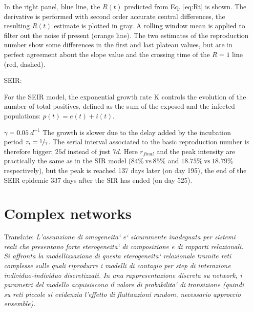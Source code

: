 \documentclass[DIV=12, BCOR=0pt]{scrartcl}  %
\begin{document}
	In the right panel, blue line, the $R(t)$ predicted from Eq. \ref{eq:Rt} is shown. 
	The derivative is performed with second order accurate central differences, the resulting $R(t)$ estimate is plotted in gray. A rolling window mean is applied to filter out the noise if present (orange line). The two estimates of the reproduction number show some differences in the first and last plateau values, but are in perfect agreement about the slope value and the crossing time of the $R = 1$ line (red, dashed).
	
	
	SEIR:	
	
	For the SEIR model, the exponential growth rate K controls the evolution of the number of total positives, defined as the sum of the exposed and the infected populations: $p(t) = e(t) + i(t)$. 
	
	
	$\gamma = 0.05 \ d^{-1}$ The growth is slower due to the delay added by the incubation period $\tau_{i}=\sfrac{1}{\gamma}$. The serial interval associated to the basic reproduction number is therefore bigger: $25 d$ instead of just $7 d$. Here $r_{final}$ and the peak intensity are practically the same as in the SIR model ($84 \% \ \mathrm{vs} \ 85 \%$ and $18.75 \% \ \mathrm{vs} \ 18.79 \% \ $ respectively), but the peak is reached 137 days later (on day 195), the end of the SEIR epidemic 337 days after the SIR has ended (on day 525). %
  

  
  \section{Complex networks}
  \label{sec:network}
  Translate: \textit{L'assunzione di omogeneita` e` sicuramente inadeguata per sistemi reali che presentano forte eterogeneita` di composizione e di rapporti relazionali. Si affronta la modellizzazione di questa eterogeneita` relazionale tramite reti complesse sulle quali riprodurre i modelli di contagio per step di interazione individuo-individuo discretizzati. In una rappresentazione discreta su network, i parametri del modello acquisiscono il valore di probabilita` di transizione (quindi su reti piccole si evidenzia l'effetto di fluttuazioni random, necessario approccio ensemble).  }
  
\end{document}
